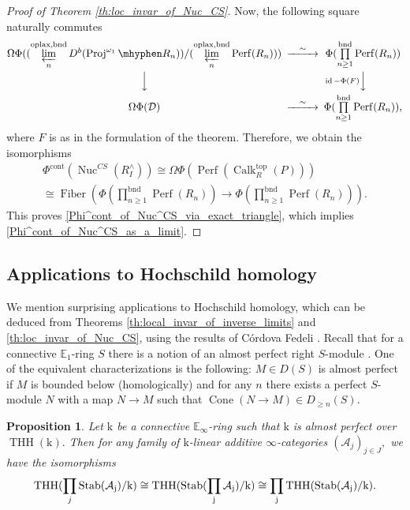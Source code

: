 \documentclass[11pt,leqno]{amsart}
\newtheorem{prop}[theo]{Proposition}
\numberwithin{equation}{section}
\newcommand{\hy}{\mhyphen}
\newcommand{\prolim}[1][]{\mathop{\varprojlim}\limits_{#1}}
\newcommand{\prodd}[1][]{\mathop{\prod}\limits_{#1}}
\newcommand{\bnd}{\operatorname{bnd}}
\newcommand{\oplax}{\operatorname{oplax}}
\newcommand{\Nuc}{\operatorname{Nuc}}
\newcommand{\Proj}{\operatorname{Proj}}
\newcommand{\Cone}{\operatorname{Cone}}
\newcommand{\Fiber}{\operatorname{Fiber}}
\newcommand{\cont}{\operatorname{cont}}
\newcommand{\bE}{{\mathbb E}}
\newcommand{\mk}{\mathrm k}
\newcommand{\cD}{{\mathcal D}}
\newcommand{\cA}{{\mathcal A}}
\newcommand{\THH}{\operatorname{THH}}
\newcommand{\topp}{\operatorname{top}}
\newcommand{\Perf}{\operatorname{Perf}}
\newcommand{\Calk}{\operatorname{Calk}}
\newcommand{\Stab}{\rm Stab}
\newcommand{\id}{\operatorname{id}}
\begin{document}
\begin{proof}[Proof of Theorem \ref{th:loc_invar_of_Nuc_CS}]
Now, the following square naturally commutes
\begin{equation*}
\begin{CD}
\Omega\Phi((\prolim[n]^{\oplax,\bnd} D^b(\Proj^{\omega_1}\hy R_n))/(\prolim[n]^{\oplax,\bnd} \Perf(R_n))) @>{\sim}>> \Phi(\prodd[n\geq 1]^{\bnd}\Perf(R_n))\\
@VVV @V{\id-\Phi(F)}VV\\
\Omega\Phi(\cD) @>{\sim}>>  \Phi(\prodd[n\geq 1]^{\bnd}\Perf(R_n)),
\end{CD}
\end{equation*}
where $F$ is as in the formulation of the theorem. Therefore, we obtain the isomorphisms
\begin{multline*}
\Phi^{\cont}(\Nuc^{CS}(R^{\wedge}_I))\cong \Omega\Phi(\Perf(\Calk_R^{\topp}(P)))\\
\cong \Fiber(\Phi(\prodd[n\geq 1]^{\bnd}\Perf(R_n))\to \Phi(\prodd[n\geq 1]^{\bnd}\Perf(R_n))).
\end{multline*}
This proves \ref{Phi^cont_of_Nuc^CS_via_exact_triangle}, which implies \ref{Phi^cont_of_Nuc^CS_as_a_limit}.
\end{proof}

\subsection{Applications to Hochschild homology}
\label{ssec:applications_to_HH}

We mention surprising applications to Hochschild homology, which can be deduced from Theorems \ref{th:local_invar_of_inverse_limits} and \ref{th:loc_invar_of_Nuc_CS}, using the results of C\'ordova Fedeli \cite{Cor}. Recall that for a connective $\bE_1$-ring $S$ there is a notion of an almost perfect right $S$-module \cite[Definition 7.2.4.10, Proposition 7.2.4.11]{Lur17}. One of the equivalent characterizations is the following: $M\in D(S)$ is almost perfect if $M$ is bounded below (homologically) and for any $n$ there exists a perfect $S$-module $N$ with a map $N\to M$ such that $\Cone(N\to M)\in D_{\geq n}(S).$ 

\begin{prop}\label{prop:THH_of_products_over_good_base}
Let $\mk$ be a connective $\bE_{\infty}$-ring such that $\mk$ is almost perfect over $\THH(\mk).$ Then for any family of $\mk$-linear additive $\infty$-categories $(\cA_j)_{j\in J},$ we have the isomorphisms
\begin{equation}\label{eq:THH_products_of_k_linear_additive}
\THH(\prodd[j]\Stab(\cA_j)/\mk)\cong\THH(\Stab(\prodd[j]\cA_j)/\mk)\cong \prodd[j]\THH(\Stab(\cA_j)/\mk).
\end{equation}
\end{prop}
\end{document}
